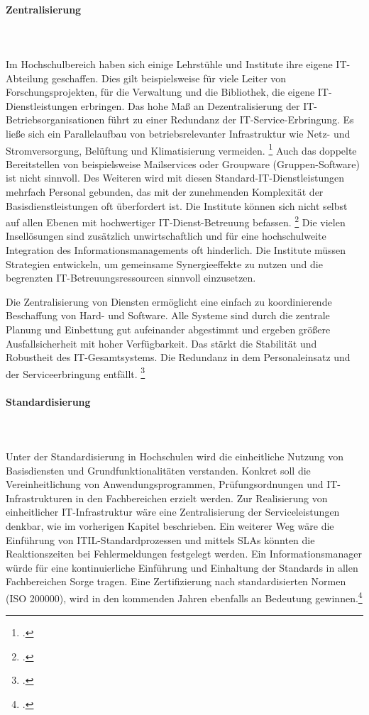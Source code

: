\paragraph{Zentralisierung}\mbox{}\\\\
\label{paragraph_zentralisierung}
Im Hochschulbereich haben sich einige Lehrstühle und Institute ihre eigene IT-Abteilung geschaffen. Dies gilt beispielsweise für viele Leiter von Forschungsprojekten, für die Verwaltung und die Bibliothek, die eigene IT-Dienstleistungen erbringen. Das hohe Maß an Dezentralisierung der IT-Betriebsorganisationen führt zu einer Redundanz der IT-Service-Erbringung. Es ließe sich ein Parallelaufbau von betriebsrelevanter Infrastruktur wie Netz- und Stromversorgung, Belüftung und Klimatisierung vermeiden.
\footcite[Vgl.][22]{stratmann_it_2013} Auch das doppelte Bereitstellen von beispielsweise Mailservices oder Groupware (Gruppen-Software) ist nicht sinnvoll. Des Weiteren wird mit diesen Standard-IT-Dienstleistungen mehrfach Personal gebunden, das mit der zunehmenden Komplexität der Basisdienstleistungen oft überfordert ist. 
Die Institute können sich nicht selbst auf allen Ebenen mit hochwertiger IT-Dienst-Betreuung befassen.
\footcite[Vgl.][21]{broecker_2011} Die vielen Insellösungen sind zusätzlich unwirtschaftlich und für eine hochschulweite Integration des Informationsmanagements oft hinderlich. Die Institute müssen Strategien entwickeln, um gemeinsame Synergieeffekte zu nutzen und die begrenzten IT-Betreuungsressourcen sinnvoll einzusetzen.

Die Zentralisierung von Diensten ermöglicht eine einfach zu koordinierende Beschaffung von Hard- und Software. Alle Systeme sind durch die zentrale Planung und Einbettung gut aufeinander abgestimmt und ergeben größere Ausfallsicherheit mit hoher Verfügbarkeit. Das stärkt die Stabilität und Robustheit des IT-Gesamtsystems. Die Redundanz in dem Personaleinsatz und der Serviceerbringung entfällt. \footcite[Vgl.][22]{moenkediek_2006}


\paragraph{Standardisierung}\mbox{}\\\\
\label{paragraph_standardisierung}
Unter der Standardisierung in Hochschulen wird die einheitliche Nutzung von Basisdiensten und Grundfunktionalitäten verstanden. Konkret soll die Vereinheitlichung von Anwendungsprogrammen, Prüfungsordnungen und IT-Infrastrukturen in den Fachbereichen erzielt werden. Zur Realisierung von einheitlicher IT-Infrastruktur wäre eine Zentralisierung der Serviceleistungen denkbar, wie im vorherigen Kapitel beschrieben. Ein weiterer Weg wäre die Einführung von ITIL-Standardprozessen und mittels SLAs könnten die Reaktionszeiten bei Fehlermeldungen festgelegt werden. Ein Informationsmanager würde für eine kontinuierliche Einführung und Einhaltung der Standards in allen Fachbereichen Sorge tragen. Eine Zertifizierung nach standardisierten Normen (ISO 200000), wird in den kommenden Jahren ebenfalls an Bedeutung gewinnen.\footcite[Vgl.][168]{breiter_implementierung_2011}


